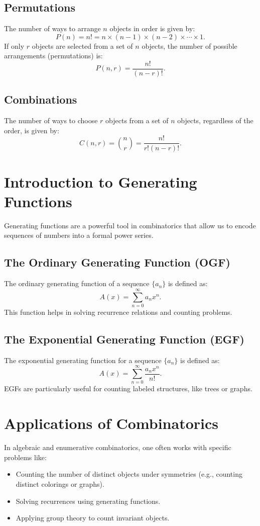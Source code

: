\documentclass{article}
\begin{document}
\subsection{Permutations}
The number of ways to arrange \( n \) objects in order is given by:
\[
P(n) = n! = n \times (n-1) \times (n-2) \times \cdots \times 1.
\]
If only \( r \) objects are selected from a set of \( n \) objects, the number of possible arrangements (permutations) is:
\[
P(n, r) = \frac{n!}{(n-r)!}.
\]

\subsection{Combinations}
The number of ways to choose \( r \) objects from a set of \( n \) objects, regardless of the order, is given by:
\[
C(n, r) = \binom{n}{r} = \frac{n!}{r!(n-r)!}.
\]

\section{Introduction to Generating Functions}
Generating functions are a powerful tool in combinatorics that allow us to encode sequences of numbers into a formal power series.

\subsection{The Ordinary Generating Function (OGF)}
The ordinary generating function of a sequence \( \{a_n\} \) is defined as:
\[
A(x) = \sum_{n=0}^{\infty} a_n x^n.
\]
This function helps in solving recurrence relations and counting problems.

\subsection{The Exponential Generating Function (EGF)}
The exponential generating function for a sequence \( \{a_n\} \) is defined as:
\[
A(x) = \sum_{n=0}^{\infty} \frac{a_n x^n}{n!}.
\]
EGFs are particularly useful for counting labeled structures, like trees or graphs.

\section{Applications of Combinatorics}
In algebraic and enumerative combinatorics, one often works with specific problems like:

\begin{itemize}
    \item Counting the number of distinct objects under symmetries (e.g., counting distinct colorings or graphs).
    \item Solving recurrences using generating functions.
    \item Applying group theory to count invariant objects.
\end{itemize}
\end{document}
